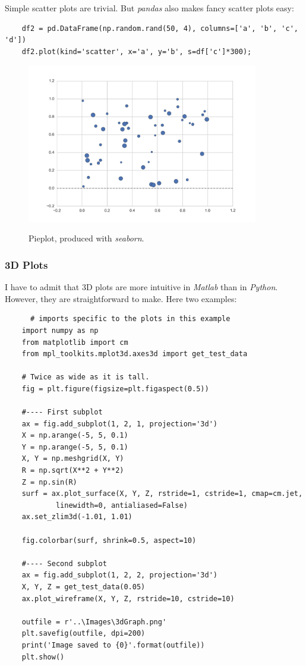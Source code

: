Simple scatter plots are trivial. But \emph{pandas} also makes fancy scatter plots easy:

\begin{lstlisting}
    df2 = pd.DataFrame(np.random.rand(50, 4), columns=['a', 'b', 'c', 'd'])
    df2.plot(kind='scatter', x='a', y='b', s=df['c']*300);
\end{lstlisting}

\begin{figure}[H]
  \centering
  \includegraphics[width=0.9\textwidth]{../Images/bivariate.png}\\
  \caption{Pieplot, produced with \emph{seaborn}.}\label{fig:bivariate}
\end{figure}

\subsubsection{3D Plots}

I have to admit that 3D plots are more intuitive in \emph{Matlab} than in \emph{Python}. However, they are straightforward to make. Here two examples:

\begin{lstlisting}
      # imports specific to the plots in this example
    import numpy as np
    from matplotlib import cm
    from mpl_toolkits.mplot3d.axes3d import get_test_data

    # Twice as wide as it is tall.
    fig = plt.figure(figsize=plt.figaspect(0.5))

    #---- First subplot
    ax = fig.add_subplot(1, 2, 1, projection='3d')
    X = np.arange(-5, 5, 0.1)
    Y = np.arange(-5, 5, 0.1)
    X, Y = np.meshgrid(X, Y)
    R = np.sqrt(X**2 + Y**2)
    Z = np.sin(R)
    surf = ax.plot_surface(X, Y, Z, rstride=1, cstride=1, cmap=cm.jet,
            linewidth=0, antialiased=False)
    ax.set_zlim3d(-1.01, 1.01)

    fig.colorbar(surf, shrink=0.5, aspect=10)

    #---- Second subplot
    ax = fig.add_subplot(1, 2, 2, projection='3d')
    X, Y, Z = get_test_data(0.05)
    ax.plot_wireframe(X, Y, Z, rstride=10, cstride=10)

    outfile = r'..\Images\3dGraph.png'
    plt.savefig(outfile, dpi=200)
    print('Image saved to {0}'.format(outfile))
    plt.show()
\end{lstlisting}

